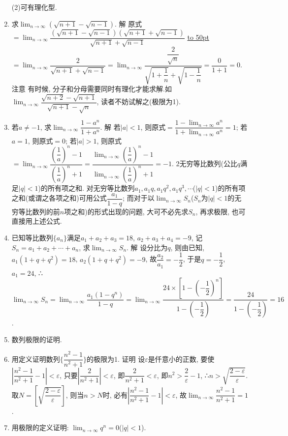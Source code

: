 \documentclass[10pt,a4paper]{article}
\newcommand{\blank}[1]{\underline{\hbox to #1pt{}}}
\begin{document}
\begin{enumerate}[1.]
(2)可有理化型.
\item 求$\displaystyle \lim_{n\to \infty} (\sqrt {n+1}-\sqrt {n-1})$.
解  原式$=\displaystyle \lim_{n\to \infty} \dfrac{(\sqrt {n+1}-\sqrt {n-1})(\sqrt {n+1}+\sqrt {n-1})}{\sqrt {n+1}+\sqrt {n-1}}$
\blank{50}$=\displaystyle \lim_{n\to \infty} \dfrac 2{\sqrt {n+1}+\sqrt {n-1}}=\displaystyle \lim_{n\to \infty} \dfrac{\dfrac 2{\sqrt n}}{\sqrt {1+\dfrac 1n}+\sqrt {1-\dfrac 1n}}=\dfrac 0{1+1}=0$.
注意  有时候, 分子和分母需要同时有理化才能求解.如$\displaystyle \lim_{n\to \infty} \dfrac{\sqrt {n+2}-\sqrt {n+1}}{\sqrt {n+1}-\sqrt n}$, 读者不妨试解之(极限为1).

\item 若$a\ne -1$, 求$\displaystyle \lim_{n\to \infty} \dfrac{1-{a^n}}{1+{a^n}}$.
解  若$|a|<1$, 则原式$=\dfrac{1-\displaystyle\lim_{n\to \infty}{a^n}}{1+\displaystyle\lim_{n\to \infty}{a^n}}=1$; 若$a=1$, 则原式$=0$;
若$|a|>1$, 则原式$=\displaystyle \lim_{n\to \infty} \dfrac{{{(\dfrac 1a)}^n}-1}{{{(\dfrac 1a)}^n}+1}=\dfrac{\displaystyle\lim_{n\to \infty}{{(\dfrac 1a)}^n}-1}{\displaystyle\lim_{n\to \infty}{{(\dfrac 1a)}^n}+1}=-1$.
2无穷等比数列(公比$q$满足$|q|<1$)的所有项之和.
对无穷等比数列$a_1,a_1q,a_1q^2,a_1q^3,\cdots$($|q|<1$)的所有项之和(或谓之各项之和)可用公式$\dfrac{a_1}{1-q}$; 而对于以$\displaystyle \lim_{n\to \infty} S_n$($S_n$为$|q|<1$的无穷等比数列的前$n$项之和)的形式出现的问题, 大可不必先求$S_n$, 再求极限, 也可直接用上述公式.
\item 已知等比数列$\{a_n\}$满足$a_1+a_2+a_3=18$, $a_2+a_3+a_4=-9$, 记$S_n=a_1+a_2+\cdots +a_n$, 求$\displaystyle \lim_{n\to \infty} S_n$.
解  设分比为$q$, 则由已知, $a_1(1+q+q^2)=18$, $a_2(1+q+q^2)=-9$,
故$\dfrac{a_2}{a_1}=-\dfrac 12$, 于是$q=-\dfrac 12$, $a_1=24$,
∴$\displaystyle \lim_{n\to \infty} S_n=\displaystyle \lim_{n\to \infty} \dfrac{{a_1}(1-{q^n})}{1-q}=\displaystyle \lim_{n\to \infty} \dfrac{24\times [1-{{(-\dfrac 12)}^n}]}{1-(-\dfrac 12)}=\dfrac{24}{1-(-\dfrac 12)}=16$.
\item 数列极限的证明.
\item 用定义证明数列$\{\dfrac{{n^2}-1}{{n^2}+1}\}$的极限为1.
证明  设$\varepsilon$是仟意小的正数, 要使$|\dfrac{{n^2}-1}{{n^2}+1}-1|<\varepsilon$, 只要$|\dfrac 2{n^2+1}|<\varepsilon$,
即$\dfrac 2{n^2+1}<\varepsilon$, 即$n^2>\dfrac 2{\varepsilon }-1$, ∴$n>\sqrt {\dfrac{2-\varepsilon }{\varepsilon }}$.
取$N=[\sqrt {\dfrac{2-\varepsilon }{\varepsilon }}]$, 则当$n>N$时, 必有$|\dfrac{{n^2}-1}{{n^2}+1}-1|<\varepsilon$, 故$\displaystyle \lim_{n\to \infty} \dfrac{{n^2}-1}{{n^2}+1}=1$.
\item 用极限的定义证明: $\displaystyle \lim_{n\to \infty} q^n=0$($|q|<1$).

\end{enumerate}
\end{document}
